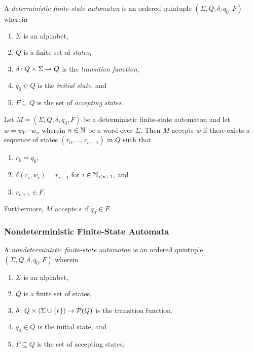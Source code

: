 \Bdf
    A \emph{deterministic finite-state automaton} is an ordered quintuple
    \((\Sigma, Q, \delta, q_0, F)\) wherein
    \begin{enumerate}
        \item \(\Sigma\) is an alphabet,
        \item \(Q\) is a finite set of \emph{states},
        \item \(\map{\delta}{Q \times \Sigma}{Q}\) is the \emph{transition
        function},
        \item \(q_0 \in Q\) is the \emph{initial state}, and
        \item \(F \subseteq Q\) is the set of \emph{accepting states}.
    \end{enumerate}
\Edf

Let \(M = (\Sigma, Q, \delta, q_0, F)\) be a deterministic finite-state
automaton and let \(w = w_0 \cdots w_n\) wherein \(n \in \setnat\) be a word
over \(\Sigma\).  Then \(M\) accepts \(w\) if there exists a sequence of states
\((r_0, \ldots, r_{n + 1})\) in \(Q\) such that
\begin{enumerate}
    \item \(r_0 = q_0\),
    \item \(\delta(r_i, w_i) = r_{i + 1}\) for \(i \in \Nln[n + 1]\), and
    \item \(r_{n + 1} \in F\).
\end{enumerate}
Furthermore, \(M\) accepts \(\epsilon\) if \(q_0 \in F\).

\subsubsection{Nondeterministic Finite-State Automata}

\Bdf
    A \emph{nondeterministic finite-state automaton} is an ordered quintuple
    \((\Sigma, Q, \delta, q_0, F)\) wherein
    \begin{enumerate}
        \item \(\Sigma\) is an alphabet,
        \item \(Q\) is a finite set of states,
        \item \(\map{\delta}{Q \times (\Sigma \cup \set{\epsilon})}{\pow(Q)}\)
        is the transition function,
        \item \(q_0 \in Q\) is the initial state, and
        \item \(F \subseteq Q\) is the set of accepting states.
    \end{enumerate}
\Edf

